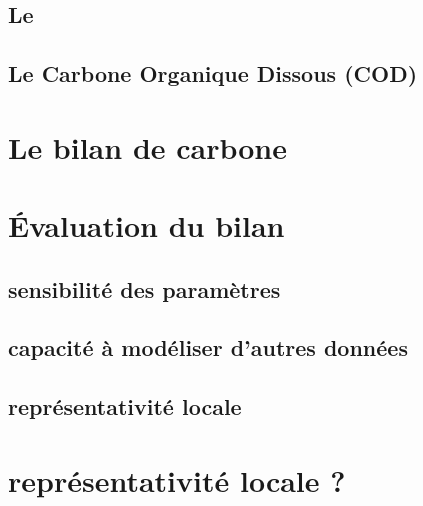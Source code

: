 \subsection{Le \chh}
\subsection{Le Carbone Organique Dissous (COD)}

\section{Le bilan de carbone}

\section{Évaluation du bilan}

\subsection{sensibilité des paramètres}

\subsection{capacité à modéliser d'autres données}

\subsection{représentativité locale}

\section{représentativité locale ?}